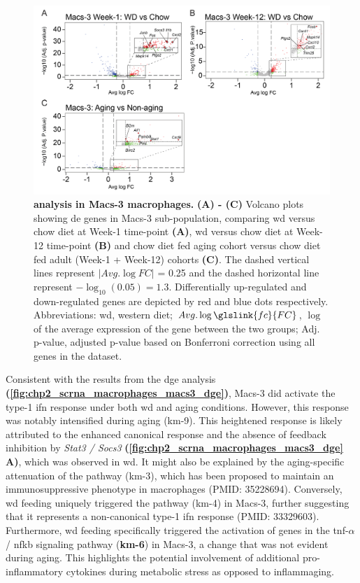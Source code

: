 \begin{figure}[t]
\centering
\includegraphics[width=\linewidth]{Chapter4/Fig/F2-11-01.png}
\caption[ analysis in Macs-3 macrophages]{\textbf{ analysis in Macs-3 macrophages.} \textbf{(A) - (C)} Volcano plots showing \gls{de} genes in Macs-3 sub-population, comparing \gls{wd} versus chow diet at Week-1 time-point \textbf{(A)}, \gls{wd} versus chow diet at Week-12 time-point \textbf{(B)} and chow diet fed aging cohort versus chow diet fed adult (Week-1 + Week-12) cohorts \textbf{(C)}. The dashed vertical lines represent $  \left|Avg. \log FC \right| $ = 0.25 and the dashed horizontal line represent $-\log_{10}(\num{0.05}) = 1.3$. Differentially up-regulated and down-regulated genes are depicted by red and blue dots respectively. Abbreviations: \gls{wd}, western diet; $Avg. \log \glslink{fc}{FC}$, $\log$  of the average expression of the gene between the two groups; Adj. p-value, adjusted p-value based on Bonferroni correction using all genes in the dataset.}
\label{fig:chp2_scrna_macrophages_macs3_dge}
\end{figure}

\par Consistent with the results from the \gls{dge} analysis \textbf{(\autoref{fig:chp2_scrna_macrophages_macs3_dge})}, Macs-3 did activate the type-1 \gls{ifn} response under both \gls{wd} and aging conditions. However, this response was notably intensified during aging (km-9). This heightened response is likely attributed to the enhanced canonical response and the absence of feedback inhibition by \textit{Stat3 / Socs3} \textbf{(\autoref{fig:chp2_scrna_macrophages_macs3_dge} A)}, which was observed in \gls{wd}. It might also be explained by the aging-specific attenuation of the  pathway (km-3), which has been proposed to maintain an immunosuppressive phenotype in macrophages (PMID: 35228694). Conversely, \gls{wd} feeding uniquely triggered the  pathway (km-4) in Macs-3, further suggesting that it represents a non-canonical type-1 \gls{ifn} response (PMID: 33329603). Furthermore, \gls{wd} feeding specifically triggered the activation of genes in the \gls{tnf}-$\alpha$ / \gls{nfkb} signaling pathway (\textbf{km-6}) in Macs-3, a change that was not evident during aging. This highlights the potential involvement of additional pro-inflammatory cytokines during metabolic stress as opposed to inflammaging.\\



